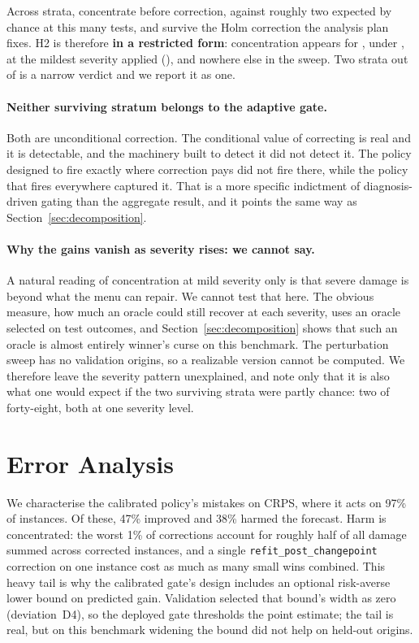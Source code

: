 Across \robHTwoTested{} strata, \robHTwoRaw{} concentrate before correction, against
roughly two expected by chance at this many tests, and \robHTwoSurviving{} survive the
Holm correction the analysis plan fixes. H2 is therefore \textbf{\verdictHTwo{} in a
restricted form}: concentration appears for \texttt{\robHTwoPolicies}, under
\robHTwoAxes{}, at the mildest severity applied (\robHTwoSeverity{}), and nowhere else
in the sweep. Two strata out of \robHTwoTested{} is a narrow verdict and we report it as
one.

\paragraph{Neither surviving stratum belongs to the adaptive gate.}
Both are unconditional correction. The conditional value of correcting is real and it
is detectable, and the machinery built to detect it did not detect it. The policy
designed to fire exactly where correction pays did not fire there, while the policy that
fires everywhere captured it. That is a more specific indictment of diagnosis-driven
gating than the aggregate result, and it points the same way as
Section~\ref{sec:decomposition}.

\paragraph{Why the gains vanish as severity rises: we cannot say.}
A natural reading of concentration at mild severity only is that severe damage is
beyond what the menu can repair. We cannot test that here. The obvious measure,
how much an oracle could still recover at each severity, uses an oracle selected on
test outcomes, and Section~\ref{sec:decomposition} shows that such an oracle is almost
entirely winner's curse on this benchmark. The perturbation sweep has no validation
origins, so a realizable version cannot be computed. We therefore leave the severity
pattern unexplained, and note only that it is also what one would expect if the two
surviving strata were partly chance: two of forty-eight, both at one severity level.

\section{Error Analysis}
\label{sec:erroranalysis}

We characterise the calibrated policy's mistakes on CRPS, where it acts on 97\% of
instances. Of these, 47\% improved and 38\% harmed the forecast. Harm is concentrated:
the worst 1\% of corrections account for roughly half of all damage summed across
corrected instances, and a single \texttt{refit\_post\_changepoint} correction on one
instance cost as much as many small wins combined. This heavy tail is why the calibrated gate's design includes an optional risk-averse lower bound on predicted gain. Validation selected that bound's width as zero (deviation~D4), so the deployed gate thresholds the point estimate; the tail is real, but on this benchmark widening the bound did not help on held-out origins.

